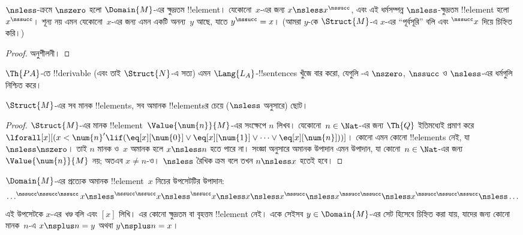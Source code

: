 \documentclass[../../../include/open-logic-section]{subfiles}
\begin{document}
\begin{prop}
 $\nsless$-ক্রমে $\nszero$ হলো
$\Domain{M}$-এর ক্ষুদ্রতম !!{element}। যেকোনো~$x$-এর জন্য
$x \nsless x^\nssucc$, এবং এই ধর্মসম্পন্ন $\nsless$-ক্ষুদ্রতম
!!{element} হলো $x^\nssucc$। শূন্য নয় এমন যেকোনো~$x$-এর জন্য এমন
একটি অনন্য~$y$ আছে,
যাতে $y^\nssucc=x$। (আমরা $y$-কে $\Struct{M}$-এ $x$-এর
``পূর্বসূরি'' বলি এবং $^\nssucc x$ দিয়ে চিহ্নিত করি।)
\end{prop}

\begin{proof}
অনুশীলনী।
\end{proof}

\begin{prob}
$\Th{PA}$-তে !!{derivable} (এবং তাই $\Struct{N}$-এ সত্য) এমন
$\Lang{L_A}$-!!{sentence}s খুঁজে বার করো, যেগুলি
-এ $\nszero$, $\nssucc$ ও
$\nsless$-এর ধর্মগুলি নিশ্চিত করে।
\end{prob}

\begin{prop}
$\Struct{M}$-এর সব মানক !!{element}s, সব অমানক !!{element}sর চেয়ে
($\nsless$ অনুসারে) ছোট।
\end{prop}

\begin{proof}
$\Struct{M}$-এর মানক !!{element}~$\Value{\num{n}}{M}$-এর সংক্ষেপে
$n$ লিখব। যেকোনো~$n \in \Nat$-এর জন্য $\Th{Q}$ ইতিমধ্যেই প্রমাণ করে
$\lforall[x][(x < \num{n}' \lif (\eq[x][\num{0}] \lor
  \eq[x][\num{1}] \lor \dots \lor \eq[x][\num{n}]))]$। কোনো
এমন কোনো !!{element}s নেই, যা $\nsless \nszero$। তাই $n$ মানক ও~$x$ অমানক হলে
$x \nsless n$ হতে পারে না। সংজ্ঞা অনুসারে অমানক উপাদান এমন উপাদান,
যা কোনো~$n \in \Nat$-এর জন্য $\Value{\num{n}}{M}$ নয়; অতএব
$x \neq n$-ও। $\nsless$ রৈখিক ক্রম বলে তখন $n \nsless x$ হতেই হবে।
\end{proof}

\begin{prop}
$\Domain{M}$-এর প্রত্যেক অমানক !!{element}~$x$ নিচের উপসেটটির উপাদান:
\[
\dots ^{\nssucc\nssucc\nssucc}x \nsless ^{\nssucc\nssucc}x \nsless
^{\nssucc}x \nsless x \nsless x^{\nssucc} \nsless x^{\nssucc\nssucc}
\nsless x^{\nssucc\nssucc\nssucc} \nsless \dots
\]
এই উপসেটকে $x$-এর \emph{খণ্ড} বলি এবং $[x]$ লিখি। এর কোনো ক্ষুদ্রতম
বা বৃহত্তম !!{element} নেই। একে সেইসব $y \in \Domain{M}$-এর সেট
হিসেবে চিহ্নিত করা যায়, যাদের জন্য কোনো মানক~$n$-এ
$x \nsplus n=y$ অথবা $y \nsplus n=x$।
\end{prop}
\end{document}
